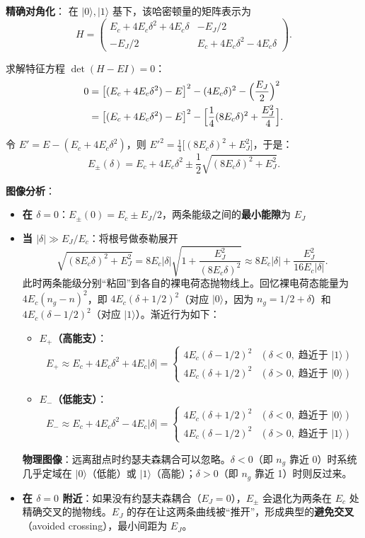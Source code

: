\textbf{精确对角化}：
在 $|0\rangle, |1\rangle$ 基下，该哈密顿量的矩阵表示为
\[
H = \begin{pmatrix}
E_c + 4E_c\delta^2 + 4E_c\delta & -E_J/2 \\[6pt]
-E_J/2 & E_c + 4E_c\delta^2 - 4E_c\delta
\end{pmatrix}.
\]

求解特征方程 $\det(H - EI) = 0$：
\begin{align*}
0 &= \bigl[(E_c + 4E_c\delta^2) - E\bigr]^2 - (4E_c\delta)^2 - \Bigl(\frac{E_J}{2}\Bigr)^2 \\
&= \bigl[(E_c + 4E_c\delta^2) - E\bigr]^2 - \Bigl[\frac{1}{4}(8E_c\delta)^2 + \frac{E_J^2}{4}\Bigr].
\end{align*}

令 $E' = E - (E_c + 4E_c\delta^2)$，则 $E'^2 = \frac{1}{4}\bigl[(8E_c\delta)^2 + E_J^2\bigr]$，于是：
\[
\boxed{E_\pm(\delta) = E_c + 4E_c\delta^2 \pm \frac{1}{2}\sqrt{(8E_c\delta)^2 + E_J^2}}.
\]

\textbf{图像分析}：
\begin{itemize}[nosep]
    \item \textbf{在 $\delta=0$}：$E_\pm(0) = E_c \pm E_J/2$，两条能级之间的\textbf{最小能隙}为 $E_J$
    
    \item \textbf{当 $|\delta| \gg E_J/E_c$}：将根号做泰勒展开
    \[
    \sqrt{(8E_c\delta)^2 + E_J^2} = 8E_c|\delta|\sqrt{1 + \frac{E_J^2}{(8E_c\delta)^2}} \approx 8E_c|\delta| + \frac{E_J^2}{16E_c|\delta|}.
    \]
    此时两条能级分别``粘回''到各自的裸电荷态抛物线上。回忆裸电荷态能量为 $4E_c(n_g-n)^2$，即 $4E_c(\delta+1/2)^2$（对应 $|0\rangle$，因为 $n_g=1/2+\delta$）和 $4E_c(\delta-1/2)^2$（对应 $|1\rangle$）。渐近行为如下：
    \begin{itemize}[nosep]
        \item \textbf{$E_+$（高能支）}：
        \[
        E_+ \approx E_c + 4E_c\delta^2 + 4E_c|\delta| = \begin{cases} 4E_c(\delta-1/2)^2 & (\delta < 0,\; \text{趋近于 }|1\rangle) \\[4pt] 4E_c(\delta+1/2)^2 & (\delta > 0,\; \text{趋近于 }|0\rangle) \end{cases}
        \]
        \item \textbf{$E_-$（低能支）}：
        \[
        E_- \approx E_c + 4E_c\delta^2 - 4E_c|\delta| = \begin{cases} 4E_c(\delta+1/2)^2 & (\delta < 0,\; \text{趋近于 }|0\rangle) \\[4pt] 4E_c(\delta-1/2)^2 & (\delta > 0,\; \text{趋近于 }|1\rangle) \end{cases}
        \]
    \end{itemize}
    
    \textbf{物理图像}：远离甜点时约瑟夫森耦合可以忽略。$\delta<0$（即 $n_g$ 靠近 0）时系统几乎定域在 $|0\rangle$（低能）或 $|1\rangle$（高能）；$\delta>0$（即 $n_g$ 靠近 1）时则反过来。
    
    \item \textbf{在 $\delta=0$ 附近}：如果没有约瑟夫森耦合（$E_J=0$），$E_\pm$ 会退化为两条在 $E_c$ 处精确交叉的抛物线。$E_J$ 的存在让这两条曲线被``推开''，形成典型的\textbf{避免交叉}（avoided crossing），最小间距为 $E_J$。
\end{itemize}

